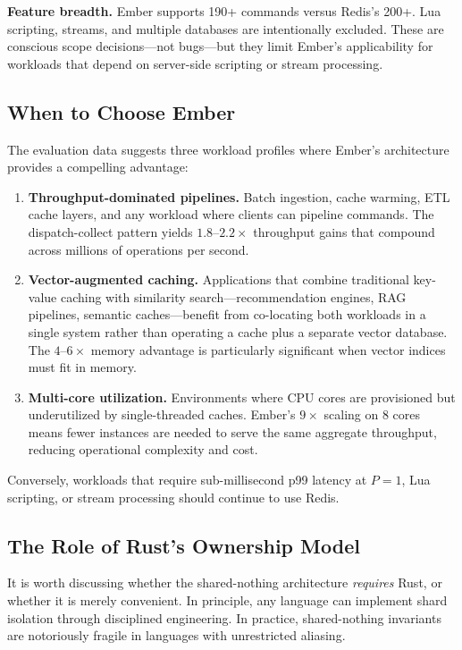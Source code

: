 \documentclass[conference]{IEEEtran}
\begin{document}
\textbf{Feature breadth.} Ember supports 190+ commands versus
Redis's 200+. Lua scripting, streams, and multiple databases are
intentionally excluded. These are conscious scope decisions---not
bugs---but they limit Ember's applicability for workloads that depend
on server-side scripting or stream processing.

\subsection{When to Choose Ember}

The evaluation data suggests three workload profiles where Ember's
architecture provides a compelling advantage:

\begin{enumerate}
  \item \textbf{Throughput-dominated pipelines.} Batch ingestion,
    cache warming, ETL cache layers, and any workload where clients
    can pipeline commands. The dispatch-collect pattern yields
    $1.8$--$2.2\times$ throughput gains that compound across millions
    of operations per second.

  \item \textbf{Vector-augmented caching.} Applications that combine
    traditional key-value caching with similarity search---recommendation
    engines, RAG pipelines, semantic caches---benefit from co-locating
    both workloads in a single system rather than operating a cache
    plus a separate vector database. The $4$--$6\times$ memory
    advantage is particularly significant when vector indices must
    fit in memory.

  \item \textbf{Multi-core utilization.} Environments where CPU
    cores are provisioned but underutilized by single-threaded caches.
    Ember's $9\times$ scaling on 8 cores means fewer instances are
    needed to serve the same aggregate throughput, reducing
    operational complexity and cost.
\end{enumerate}

Conversely, workloads that require sub-millisecond p99 latency at
$P{=}1$, Lua scripting, or stream processing should continue to
use Redis.

\subsection{The Role of Rust's Ownership Model}

It is worth discussing whether the shared-nothing architecture
\emph{requires} Rust, or whether it is merely convenient. In
principle, any language can implement shard isolation through
disciplined engineering. In practice, shared-nothing invariants are
notoriously fragile in languages with unrestricted aliasing.
\end{document}
